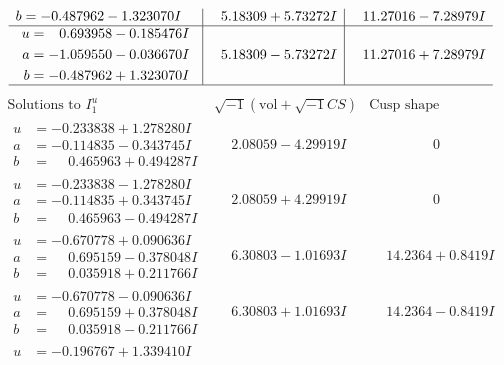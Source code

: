 \documentclass[1p]{elsarticle_modified}
\theoremstyle{definition}
\newcommand{\I}{\sqrt{-1}}
\begin{document}
$$\begin{array}{c|c|c}
\begin{aligned}
b &= -0.487962 - 1.323070 I\end{aligned}
 & \phantom{-}5.18309 + 5.73272 I & \phantom{-}11.27016 - 7.28979 I \\ \hline\begin{aligned}
u &= \phantom{-}0.693958 - 0.185476 I \\
a &= -1.059550 - 0.036670 I \\
b &= -0.487962 + 1.323070 I\end{aligned}
 & \phantom{-}5.18309 - 5.73272 I & \phantom{-}11.27016 + 7.28979 I\\
 \hline 
 \end{array}$$\newpage$$\begin{array}{c|c|c}  
\text{Solutions to }I^u_{1}& \I (\text{vol} + \sqrt{-1}CS) & \text{Cusp shape}\\
 \hline 
\begin{aligned}
u &= -0.233838 + 1.278280 I \\
a &= -0.114835 - 0.343745 I \\
b &= \phantom{-}0.465963 + 0.494287 I\end{aligned}
 & \phantom{-}2.08059 - 4.29919 I & \phantom{-0.000000 } 0 \\ \hline\begin{aligned}
u &= -0.233838 - 1.278280 I \\
a &= -0.114835 + 0.343745 I \\
b &= \phantom{-}0.465963 - 0.494287 I\end{aligned}
 & \phantom{-}2.08059 + 4.29919 I & \phantom{-0.000000 } 0 \\ \hline\begin{aligned}
u &= -0.670778 + 0.090636 I \\
a &= \phantom{-}0.695159 - 0.378048 I \\
b &= \phantom{-}0.035918 + 0.211766 I\end{aligned}
 & \phantom{-}6.30803 - 1.01693 I & \phantom{-}14.2364 + 0.8419 I \\ \hline\begin{aligned}
u &= -0.670778 - 0.090636 I \\
a &= \phantom{-}0.695159 + 0.378048 I \\
b &= \phantom{-}0.035918 - 0.211766 I\end{aligned}
 & \phantom{-}6.30803 + 1.01693 I & \phantom{-}14.2364 - 0.8419 I \\ \hline\begin{aligned}
u &= -0.196767 + 1.339410 I \\

\end{aligned}
\end{array}$$
\end{document}
